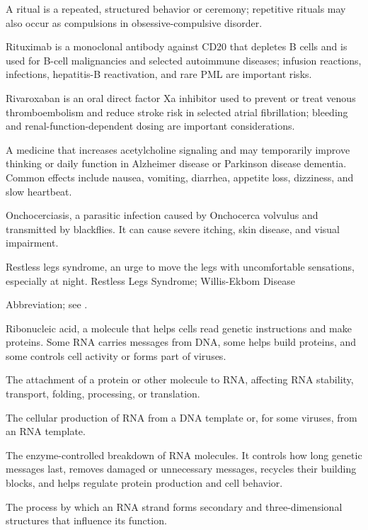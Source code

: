  A ritual is a repeated, structured behavior or ceremony; repetitive rituals may also occur as compulsions in obsessive-compulsive disorder.

 Rituximab is a monoclonal antibody against CD20 that depletes B cells and is used for B-cell malignancies and selected autoimmune diseases; infusion reactions, infections, hepatitis-B reactivation, and rare PML are important risks.

 Rivaroxaban is an oral direct factor Xa inhibitor used to prevent or treat venous thromboembolism and reduce stroke risk in selected atrial fibrillation; bleeding and renal-function-dependent dosing are important considerations.

 A medicine that increases acetylcholine signaling and may temporarily improve thinking or daily function in Alzheimer disease or Parkinson disease dementia. Common effects include nausea, vomiting, diarrhea, appetite loss, dizziness, and slow heartbeat.

 Onchocerciasis, a parasitic infection caused by Onchocerca volvulus and transmitted by blackflies. It can
cause severe itching, skin disease, and visual impairment.

 Restless legs syndrome, an urge to move the legs with uncomfortable sensations, especially at night.
\synonyms
Restless Legs Syndrome; Willis-Ekbom Disease

 Abbreviation; see .

 Ribonucleic acid, a molecule that helps cells read genetic instructions and make proteins. Some RNA carries messages from DNA, some helps build proteins, and some controls cell activity or forms part of viruses.

 The attachment of a protein or other molecule to RNA, affecting RNA stability, transport, folding, processing, or translation.

 The cellular production of RNA from a DNA template or, for some viruses, from an RNA template.

 The enzyme-controlled breakdown of RNA molecules. It controls how long genetic messages last, removes damaged or unnecessary messages, recycles their building blocks, and helps regulate protein production and cell behavior.

 The process by which an RNA strand forms secondary and three-dimensional structures that influence its function.

